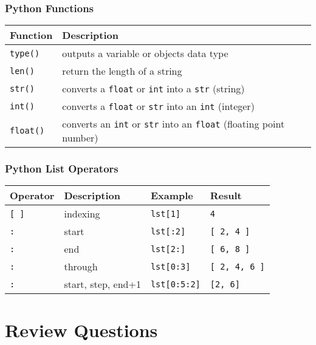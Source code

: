 \documentclass{book}
\newcommand{\passthrough}[1]{#1}
\begin{document}
\hypertarget{python-functions}{%
\subsubsection{Python Functions}\label{python-functions}}

\begin{longtable}[]{@{}ll@{}}
\toprule
Function & Description\tabularnewline
\midrule
\endhead
\passthrough{\lstinline!type()!} & outputs a variable or objects data
type\tabularnewline
\passthrough{\lstinline!len()!} & return the length of a
string\tabularnewline
\passthrough{\lstinline!str()!} & converts a
\passthrough{\lstinline!float!} or \passthrough{\lstinline!int!} into a
\passthrough{\lstinline!str!} (string)\tabularnewline
\passthrough{\lstinline!int()!} & converts a
\passthrough{\lstinline!float!} or \passthrough{\lstinline!str!} into an
\passthrough{\lstinline!int!} (integer)\tabularnewline
\passthrough{\lstinline!float()!} & converts an
\passthrough{\lstinline!int!} or \passthrough{\lstinline!str!} into an
\passthrough{\lstinline!float!} (floating point number)\tabularnewline
\bottomrule
\end{longtable}

\hypertarget{python-list-operators}{%
\subsubsection{Python List Operators}\label{python-list-operators}}

\begin{longtable}[]{@{}llll@{}}
\toprule
Operator & Description & Example & Result\tabularnewline
\midrule
\endhead
\passthrough{\lstinline![ ]!} & indexing &
\passthrough{\lstinline!lst[1]!} &
\passthrough{\lstinline!4!}\tabularnewline
\passthrough{\lstinline!:!} & start & \passthrough{\lstinline!lst[:2]!}
& \passthrough{\lstinline![ 2, 4 ]!}\tabularnewline
\passthrough{\lstinline!:!} & end & \passthrough{\lstinline!lst[2:]!} &
\passthrough{\lstinline![ 6, 8 ]!}\tabularnewline
\passthrough{\lstinline!:!} & through &
\passthrough{\lstinline!lst[0:3]!} &
\passthrough{\lstinline![ 2, 4, 6 ]!}\tabularnewline
\passthrough{\lstinline!:!} & start, step, end+1 &
\passthrough{\lstinline!lst[0:5:2]!} &
\passthrough{\lstinline![2, 6]!}\tabularnewline
\bottomrule
\end{longtable}
    




    
        \hypertarget{review-questions}{%
\section{Review Questions}\label{review-questions}}
    
\end{document}
